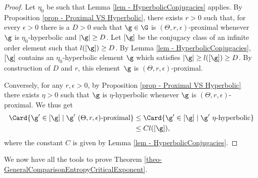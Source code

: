 \begin{proof}
Let $\eta_0$ be such that Lemma \ref{lem - HyperbolicConjugacies} applies. By Proposition \ref{prop - Proximal VS Hyperbolic}, there exists $r>0$ such that, for every $\epsilon>0$ there is a $D>0$ such that $\g\in \G$ is $(\Theta,r,\epsilon)$-proximal whenever $\g$ is $\eta_0$-hyperbolic and $\vert \g \vert \geq D$. Let $[\g]$ be the conjugacy class of an infinite order element such that $l([\g]) \geq D$. By Lemma \ref{lem - HyperbolicConjugacies}, $[\g]$ contains an $\eta_0$-hyperbolic element $\g$ which satisfies $\vert \g \vert \geq l([\g])\geq D$. By construction of $D$ and $r$, this element~$\g$ is $(\Theta,r,\epsilon)$-proximal.

Conversely, for any $r,\epsilon>0$, by Proposition \ref{prop - Proximal VS Hyperbolic} there exists $\eta >0$ such that $\g$ is $\eta$-hyperbolic whenever $\g$ is $(\Theta,r,\epsilon)$-proximal. We thus get
\begin{align*}\Card \{\g' \in [\g]\mid \g' \textrm{ $(\Theta,r,\epsilon)$-proximal}\} &\leq \Card \{\g' \in [\g] \mid \g' \textrm{ $\eta$-hyperbolic}\} \\
& \leq C l([\g]),
\end{align*}
where the constant $C$ is given by Lemma \ref{lem - HyperbolicConjugacies}.
\end{proof}

We now have all the tools to prove Theorem \ref{theo-GeneralComparisonEntropyCriticalExponent}.
\Changelback

